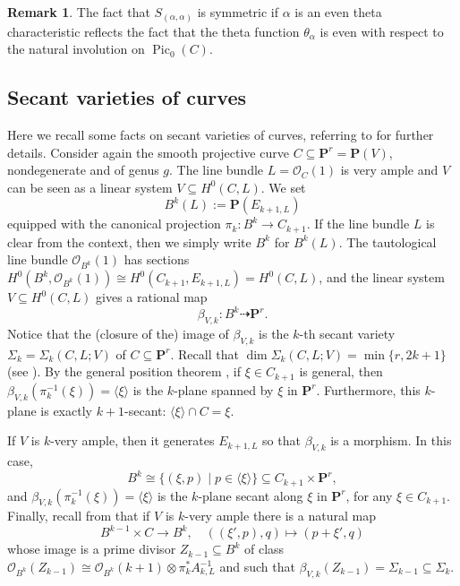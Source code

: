 \documentclass[12pt]{amsart}
\newcounter{thmcounter}
\numberwithin{equation}{section}
\numberwithin{thmcounter}{section}
\theoremstyle{definition}
\newtheorem{remark}[thmcounter]{Remark}
\theoremstyle{claim}
\newcommand{\nP}{\mathbf{P}}
\newcommand{\sO}{\mathscr{O}}
\begin{document}
\begin{remark} 
The fact that $S_{(\alpha,\alpha)}$ is symmetric if $\alpha$ is an even theta characteristic reflects the fact that the theta function $\theta_{\alpha}$ is even with respect to the natural involution on $\operatorname{Pic}_0(C)$.
\end{remark}





\subsection{Secant varieties of curves}\label{subsec:secvar}
Here we recall some facts on secant varieties of curves, referring  to \cite{ENP, ENP3} for further details.
Consider again the smooth projective curve $C \subseteq \nP^r=\nP(V)$, nondegenerate and of genus $g$. The line bundle $L=\sO_C(1)$ is very ample and $V$ can be seen as a linear system $V\subseteq H^0(C,L)$. We set
$$
B^{k}(L):=\nP(E_{k+1,L})
$$
equipped with the canonical projection $\pi_k \colon B^{k} \rightarrow C_{k+1}$. If the line bundle $L$ is clear from the context, then we simply write $B^k$ for $B^k(L)$. The tautological line bundle $\sO_{B^k}(1)$ has sections $H^0(B^k,\sO_{B^k}(1)) \cong H^0(C_{k+1},E_{k+1,L}) = H^0(C,L)$, and the linear system $V\subseteq H^0(C,L)$ gives a rational map
$$
\beta_{V,k} \colon B^k \dashrightarrow  \nP^r.
$$
Notice that the  (closure of the) image of $\beta_{V,k}$ is the $k$-th secant variety $\Sigma_k=\Sigma_k(C,L;V)$ of $C \subseteq \nP^r$. Recall that $\dim \Sigma_k(C,L;V) = \min\{r, 2k+1\}$ (see \cite{lange}). By the general position theorem \cite[p.109]{ACGH}, if $\xi\in C_{k+1}$ is general, then $\beta_{V,k}(\pi_k^{-1}(\xi)) = \langle \xi \rangle$ is the $k$-plane spanned by $\xi$ in $\nP^r$. Furthermore, this $k$-plane is exactly $k+1$-secant: $\langle \xi \rangle \cap C = \xi$.  

\medskip


If $V$ is $k$-very ample, then it generates $E_{k+1,L}$ so that $\beta_{V,k}$ is a morphism. In this case,
$$
B^k \cong \{ (\xi, p)  \mid p \in \langle \xi \rangle\} \subseteq C_{k+1} \times \nP^r,
$$
and $\beta_{V,k}(\pi_k^{-1}(\xi)) = \langle \xi \rangle$ is the $k$-plane secant along $\xi$ in $\nP^r$, for any $\xi\in C_{k+1}$. Finally, recall from \cite{ENP} that if $V$ is $k$-very ample there is a natural map
\[ B^{k-1}\times C \longrightarrow B^k, \quad ((\xi',p),q) \longmapsto (p+\xi',q)\]
whose image is a prime divisor $Z_{k-1}\subseteq B^k$ of class $\sO_{B^k}(Z_{k-1})\cong \sO_{B^k}(k+1)\otimes \pi_k^*A_{k,L}^{-1}$ and such that $\beta_{V,k}(Z_{k-1})=\Sigma_{k-1} \subseteq \Sigma_k$.
\end{document}
